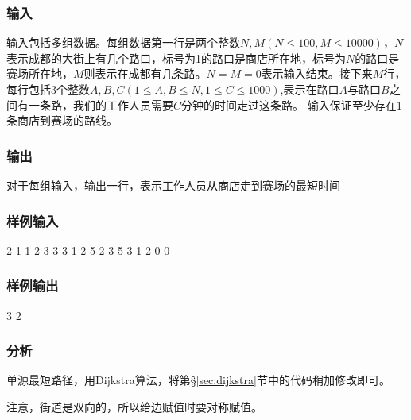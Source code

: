 \subsubsection{输入}
输入包括多组数据。每组数据第一行是两个整数$N,M(N \leq 100,M \leq 10000)$，$N$表示成都的大街上有几个路口，标号为1的路口是商店所在地，标号为$N$的路口是赛场所在地，$M$则表示在成都有几条路。$N=M=0$表示输入结束。接下来$M$行，每行包括3个整数$A,B,C(1 \leq A,B \leq N,1 \leq C \leq 1000)$,表示在路口$A$与路口$B$之间有一条路，我们的工作人员需要$C$分钟的时间走过这条路。
输入保证至少存在1条商店到赛场的路线。

\subsubsection{输出}
对于每组输入，输出一行，表示工作人员从商店走到赛场的最短时间

\subsubsection{样例输入}
\begin{Code}
2 1
1 2 3
3 3
1 2 5
2 3 5
3 1 2
0 0
\end{Code}

\subsubsection{样例输出}
\begin{Code}
3
2
\end{Code}

\subsubsection{分析}
单源最短路径，用Dijkstra算法，将第\S\ref{sec:dijkstra}节中的代码稍加修改即可。

注意，街道是双向的，所以给边赋值时要对称赋值。

